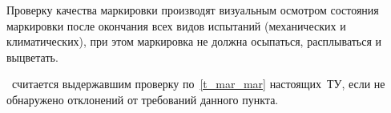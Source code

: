 Проверку качества маркировки производят визуальным осмотром состояния маркировки после окончания всех видов испытаний (механических и климатических), при этом маркировка не должна осыпаться, расплываться и выцветать.

\dut \ считается выдержавшим проверку по~\ref{t_mar_mar} настоящих~ТУ, если не обнаружено отклонений от требований данного пункта.
